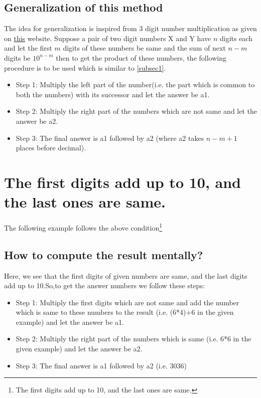 \documentclass{article}
\begin{document}
\subsection{Generalization of this method}
\label{subsec5}
The idea for generalization is inspired from 3 digit number multiplication as given on \href{http://www.vedantatree.com/2012/05/vedic-math-multiplication-of-numbers.html}{this} website.
Suppose a pair of two digit numbers X and Y have $n$ digits each and let the first $m$ digits of these numbers be same and the sum of next $n-m$ digits be $10^{n-m}$ then to get the product of these numbers, the following procedure is to be used which is similar to \ref{subsec1}.
\begin{itemize}[leftmargin=\dimexpr\parindent+0\relax]
     \item Step 1: Multiply the left part of the number(i.e. the part which is common to both the numbers) with its successor and let the answer be a1.
     \item Step 2: Multiply the right part of the numbers which are not same  and let the answer be a2.
     \item Step 3: The final answer is a1 followed by a2 (where a2 takes $n-m+1$ places before decimal).
\end{itemize}

\section{The first digits add up to 10, and the last ones are same.}
\label{sec3}
The following example follows the above condition\footnote{The first digits add up to 10, and the last ones are same.}

\subsection{How to compute the result mentally?}
\label{subsec6}
Here, we see that the first digits of given numbers are same, and the last digits add up to 10.So,to get the answer numbers we follow these steps:
\begin{itemize}[leftmargin=\dimexpr\parindent+0\relax]
     \item Step 1: Multiply the first digits which are not same and add the number which is same to these numbers to the result (i.e. (6*4)+6 in the given example) and let the answer be a1.
     \item Step 2: Multiply the right part of the numbers which is same (i.e. 6*6 in the given example) and let the answer be a2.
     \item Step 3: The final answer is a1 followed by a2 (i.e. 3036)
\end{itemize}
\end{document}
